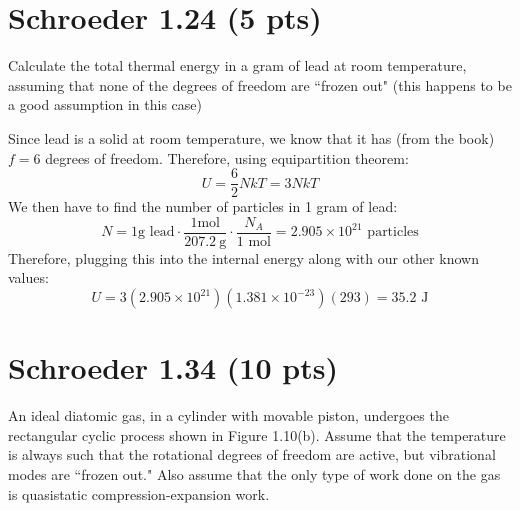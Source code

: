 \documentclass[11pt]{article}
\begin{document}
	\pagebreak

	\section*{Schroeder 1.24 (5 pts)}

	Calculate the total thermal energy in a gram of lead at room temperature, assuming that none of the degrees
	of freedom are ``frozen out" (this happens to be a good assumption in this case)

	\begin{solution}
		Since lead is a solid at room temperature, we know that it has (from the book) $f = 6$ degrees of 
		freedom. Therefore, using equipartition theorem:
		\[
		U = \frac{6}{2}NkT = 3NkT
		\] 
		We then have to find the number of particles in 1 gram of lead:
		\[
		N =	1 \text{g lead} \cdot \frac{1 \text{mol}}{207.2 \ \mathrm g} \cdot \frac{N_A}{1 \text{ mol}} = 
			2.905 \times 10^{21} \text{ particles}
		\] 
		Therefore, plugging this into the internal energy along with our other known values:
		\[
			U = 3(2.905 \times 10^{21})(1.381 \times 10^{-23})(293) = 35.2 \text{ J}
		\] 
	\end{solution}

	\pagebreak

	\section*{Schroeder 1.34 (10 pts)}
	An ideal diatomic gas, in a cylinder with movable piston, undergoes the rectangular cyclic process shown in
	Figure 1.10(b). Assume that the temperature is always such that the rotational degrees of freedom are 
	active, but vibrational modes are ``frozen out." Also assume that the only type of work done on the gas 
	is quasistatic compression-expansion work. 

	\begin{center}
	\end{center}
\end{document}
